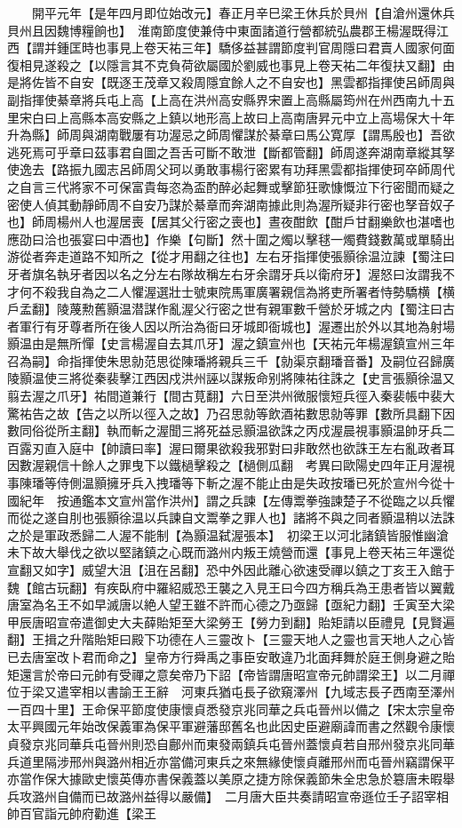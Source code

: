 　　開平元年【是年四月即位始改元】春正月辛巳梁王休兵於貝州【自滄州還休兵貝州且因魏博糧餉也】　淮南節度使兼侍中東面諸道行營都統弘農郡王楊渥既得江西【謂并鍾匡時也事見上卷天祐三年】驕侈益甚謂節度判官周隱曰君賣人國家何面復相見遂殺之【以隱言其不克負荷欲屬國於劉威也事見上卷天祐二年復扶又翻】由是將佐皆不自安【既逐王茂章又殺周隱宜餘人之不自安也】黑雲都指揮使呂師周與副指揮使綦章將兵屯上高【上高在洪州高安縣界宋置上高縣屬筠州在州西南九十五里宋白曰上高縣本高安縣之上鎮以地形高上故曰上高南唐昇元中立上高場保大十年升為縣】師周與湖南戰屢有功渥忌之師周懼謀於綦章曰馬公寛厚【謂馬殷也】吾欲逃死焉可乎章曰茲事君自圖之吾舌可斷不敢泄【斷都管翻】師周遂奔湖南章縱其孥使逸去【路振九國志呂師周父珂以勇敢事楊行密累有功拜黑雲都指揮使珂卒師周代之自言三代將家不可保富貴每恣為盃酌醉必起舞或擊節狂歌慷慨泣下行密聞而疑之密使人偵其動靜師周不自安乃謀於綦章而奔湖南據此則為渥所疑非行密也孥音奴子也】師周楊州人也渥居喪【居其父行密之喪也】晝夜酣飲【酣戶甘翻樂飲也湛嗜也應劭曰洽也張宴曰中酒也】作樂【句斷】然十圍之燭以擊毬一燭費錢數萬或單騎出游從者奔走道路不知所之【從才用翻之往也】左右牙指揮使張顥徐温泣諫【蜀注曰牙者旗名執牙者因以名之分左右隊故稱左右牙余謂牙兵以衛府牙】渥怒曰汝謂我不才何不殺我自為之二人懼渥選壯士號東院馬軍廣署親信為將吏所署者恃勢驕横【横戶孟翻】陵蔑勲舊顥温潜謀作亂渥父行密之世有親軍數千營於牙城之内【蜀注曰古者軍行有牙尊者所在後人因以所治為衙曰牙城即衙城也】渥遷出於外以其地為射場顥温由是無所憚【史言楊渥自去其爪牙】渥之鎮宣州也【天祐元年楊渥鎮宣州三年召為嗣】命指揮使朱思勍范思從陳璠將親兵三千【勍渠京翻璠音番】及嗣位召歸廣陵顥温使三將從秦裴擊江西因戍洪州誣以謀叛命别將陳祐往誅之【史言張顥徐温又翦去渥之爪牙】祐間道兼行【間古莧翻】六日至洪州微服懷短兵徑入秦裴帳中裴大驚祐告之故【告之以所以徑入之故】乃召思勍等飲酒祐數思勍等罪【數所具翻下因數同俗從所主翻】執而斬之渥聞三將死益忌顥温欲誅之丙戍渥晨視事顥温帥牙兵二百露刃直入庭中【帥讀曰率】渥曰爾果欲殺我邪對曰非敢然也欲誅王左右亂政者耳因數渥親信十餘人之罪曳下以鐵檛擊殺之【檛側瓜翻　考異曰歐陽史四年正月渥視事陳璠等侍側温顥擁牙兵入拽璠等下斬之渥不能止由是失政按璠已死於宣州今從十國紀年　按通鑑本文宣州當作洪州】謂之兵諫【左傳鬻拳強諫楚子不從臨之以兵懼而從之遂自刖也張顥徐温以兵諫自文鬻拳之罪人也】諸將不與之同者顥温稍以法誅之於是軍政悉歸二人渥不能制【為顥温弑渥張本】　初梁王以河北諸鎮皆服惟幽滄未下故大舉伐之欲以堅諸鎮之心既而潞州内叛王燒營而還【事見上卷天祐三年還從宣翻又如字】威望大沮【沮在呂翻】恐中外因此離心欲速受禪以鎮之丁亥王入館于魏【館古玩翻】有疾臥府中羅紹威恐王襲之入見王曰今四方稱兵為王患者皆以翼戴唐室為名王不如早滅唐以絶人望王雖不許而心德之乃亟歸【亟紀力翻】壬寅至大梁甲辰唐昭宣帝遣御史大夫薛貽矩至大梁勞王【勞力到翻】貽矩請以臣禮見【見賢遍翻】王揖之升階貽矩曰殿下功德在人三靈改卜【三靈天地人之靈也言天地人之心皆已去唐室改卜君而命之】皇帝方行舜禹之事臣安敢違乃北面拜舞於庭王側身避之貽矩還言於帝曰元帥有受禪之意矣帝乃下詔【帝皆謂唐昭宣帝元帥謂梁王】以二月禪位于梁又遣宰相以書諭王王辭　河東兵猶屯長子欲窺澤州【九域志長子西南至澤州一百四十里】王命保平節度使康懷貞悉發京兆同華之兵屯晉州以備之【宋太宗皇帝太平興國元年始改保義軍為保平軍避藩邸舊名也此因史臣避廟諱而書之然觀令康懷貞發京兆同華兵屯晉州則恐自鄜州而東發兩鎮兵屯晉州蓋懷貞若自邢州發京兆同華兵道里隔涉邢州與潞州相近亦當備河東兵之來無緣使懷貞離邢州而屯晉州竊謂保平亦當作保大據歐史懷英傳亦書保義蓋以美原之捷方除保義節朱全忠急於簒唐未暇舉兵攻潞州自備而已故潞州益得以嚴備】　二月唐大臣共奏請昭宣帝遜位壬子詔宰相帥百官詣元帥府勸進【梁王